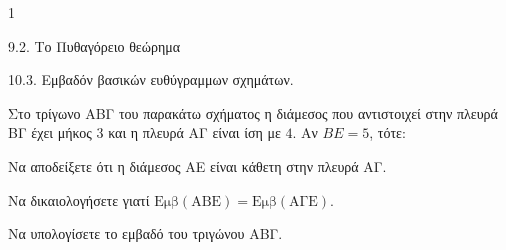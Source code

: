 \begin{ylh}{1}
    \item 9.2. Το Πυθαγόρειο θεώρημα
    \item 10.3. Εμβαδόν βασικών ευθύγραμμων σχημάτων.
\end{ylh}
\begin{figure}
\end{figure}
Στο τρίγωνο ΑΒΓ του παρακάτω σχήματος η διάμεσος που αντιστοιχεί στην πλευρά ΒΓ έχει μήκος $3$ και η πλευρά ΑΓ είναι ίση με $4$. Αν $BE=5$, τότε:
\begin{alist}
\item Να αποδείξετε ότι η διάμεσος ΑΕ είναι κάθετη στην πλευρά ΑΓ. 
\item 
    \begin{rlist}
    \item Να δικαιολογήσετε γιατί $\text{Eμβ}(\text{ΑΒΕ})=\text{Eμβ}(\text{ΑΓΕ})$. 
    \item Να υπολογίσετε το εμβαδό του τριγώνου ΑΒΓ. 
    \end{rlist}
\end{alist}
